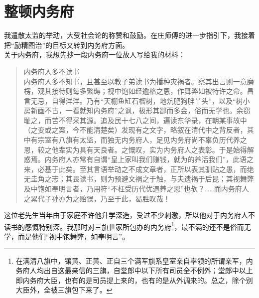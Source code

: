 \fancyhead[RO]{\thepage} %
\fancyhead[LE]{\thepage} %
\chapter*{整顿内务府}
我遣散太监的举动，大受社会论的称赞和鼓励。在庄师傅的进一步指引下，我接着把“励精图治”的目标又转到内务府方面。\\

关于内务府，我想先抄一段内务府一位故人写给我的材料：\\

\begin{quote}
	内务府人多不读书\\

内务府人多不知书，且甚至以教子弟读书为播种灾祸者。察其出言则一意磨楞，观其接待则每多繁缛；视中饱如经逾格之恩，作舞弊如被特许之命。昌言无忌，自得洋洋。乃有“天棚鱼缸石榴树，地炕肥狗胖丫头”，以及“树小房新画不古，一看就知内务府”之讽，极形其鄙而多金，俗而无学也。余窃耻之，而苦不得采其源。追及民十七八之间，遍读东华录，在朝某事故中（之变或之案，今不能清楚矣）发现有之文字，略叙在清代中之背反者，其中有宗室有八旗有太监，而独无内务府人，足见内务府尚不辜负历代养之恩，较之他辈实为具有天良者。之慨叹，实为内务府人之表彰。于是始得解惑焉。内务府人亦常有自谓“皇上家叫我们赚钱，就为的养活我们”，此语之来，必基于此矣。至其言语举动之不成文章者，正所以表其驯贴之愚，而绝无圭角之志；其畏读书，则为预避文祸之于触，与夫遗祸于后昆；其视舞弊及中饱如奉明言者，乃用符“不枉受历代优遇养之恩”也欤？……而内务府人之累代子孙亦为之贻误，乃至于此，曷胜叹哉！\\
\end{quote}

这位老先生当年由于家庭不许他升学深造，受过不少刺激，所以他对于内务府人不读书的感慨特别深。我那时对三旗世家所包办的内务府\footnote{在满清八旗中，镶黄、正黄、正自三个满军旗系皇室亲自率领的所谓亲军，内务府人均出自这最亲信的三旗，自堂郎中以下所有司员全不例外；堂郎中以上即内务府大臣，也有的是司员提上来的，也有的是从外调来的。总之，除个别大臣外，全被三旗包下来了。}，最不满的还不是俗而无学，而是他们“视中饱舞弊，如奉明言”。\\

